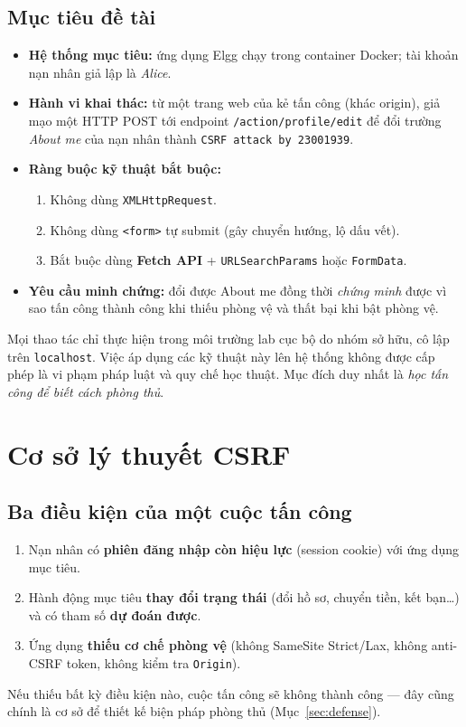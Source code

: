 \documentclass[11pt,a4paper]{article}
\begin{document}
\subsection{Mục tiêu đề tài}
\begin{itemize}
  \item \textbf{Hệ thống mục tiêu:} ứng dụng Elgg chạy trong container Docker; tài khoản nạn nhân giả lập là \emph{Alice}.
  \item \textbf{Hành vi khai thác:} từ một trang web của kẻ tấn công (khác origin), giả mạo một HTTP POST tới endpoint \texttt{/action/profile/edit} để đổi trường \emph{About me} của nạn nhân thành \texttt{CSRF attack by 23001939}.
  \item \textbf{Ràng buộc kỹ thuật bắt buộc:}
  \begin{enumerate}
    \item \no{} Không dùng \texttt{XMLHttpRequest}.
    \item \no{} Không dùng \texttt{<form>} tự submit (gây chuyển hướng, lộ dấu vết).
    \item \yes{} Bắt buộc dùng \textbf{Fetch API} + \texttt{URLSearchParams} hoặc \texttt{FormData}.
  \end{enumerate}
  \item \textbf{Yêu cầu minh chứng:} đổi được About me đồng thời \emph{chứng minh} được vì sao tấn công thành công khi thiếu phòng vệ và thất bại khi bật phòng vệ.
\end{itemize}

\begin{warnbox}
Mọi thao tác chỉ thực hiện trong môi trường lab cục bộ do nhóm sở hữu, cô lập trên \texttt{localhost}. Việc áp dụng các kỹ thuật này lên hệ thống không được cấp phép là vi phạm pháp luật và quy chế học thuật. Mục đích duy nhất là \emph{học tấn công để biết cách phòng thủ}.
\end{warnbox}

\section{Cơ sở lý thuyết CSRF}
\subsection{Ba điều kiện của một cuộc tấn công}
\begin{enumerate}
  \item Nạn nhân có \textbf{phiên đăng nhập còn hiệu lực} (session cookie) với ứng dụng mục tiêu.
  \item Hành động mục tiêu \textbf{thay đổi trạng thái} (đổi hồ sơ, chuyển tiền, kết bạn\ldots) và có tham số \textbf{dự đoán được}.
  \item Ứng dụng \textbf{thiếu cơ chế phòng vệ} (không SameSite Strict/Lax, không anti-CSRF token, không kiểm tra \texttt{Origin}).
\end{enumerate}
Nếu thiếu bất kỳ điều kiện nào, cuộc tấn công sẽ không thành công — đây cũng chính là cơ sở để thiết kế biện pháp phòng thủ (Mục~\ref{sec:defense}).
\end{document}
